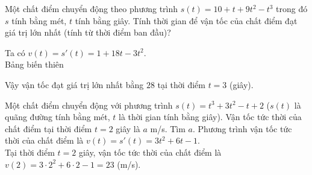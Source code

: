 \begin{bt}%
Một chất điểm chuyển động theo phương trình $s \left(t \right)=10+t+9t^2-t^3$ trong đó $s$ tính bằng mét, $t$ tính bằng giây. Tính thời gian để vận tốc của chất điểm đạt giá trị lớn nhất (tính từ thời điểm ban đầu)?
\loigiai
{
Ta có $v(t)=s'(t)=1+18t-3t^2$.\\
Bảng biến thiên
\begin{center}
\end{center}
Vậy vận tốc đạt giá trị lớn nhất bằng $28$ tại thời điểm $t=3$ (giây).
}
\end{bt}

\begin{bt}%
Một chất điểm chuyển động với phương trình $s(t)=t^3+3t^2-t+2$ ($s(t)$ là quãng đường tính bằng mét, $t$ là thời gian tính bằng giây). Vận tốc tức thời của chất điểm tại thời điểm $t=2$ giây là $a$ m/s. Tìm $a$.
\loigiai
{
Phương trình vận tốc tức thời của chất điểm là $v(t)=s'(t)=3t^2+6t-1$. \\
Tại thời điểm $t=2$ giây, vận tốc tức thời của chất điểm là $v(2)=3\cdot2^2+6\cdot 2-1=23$ (m/s).
}
\end{bt}

